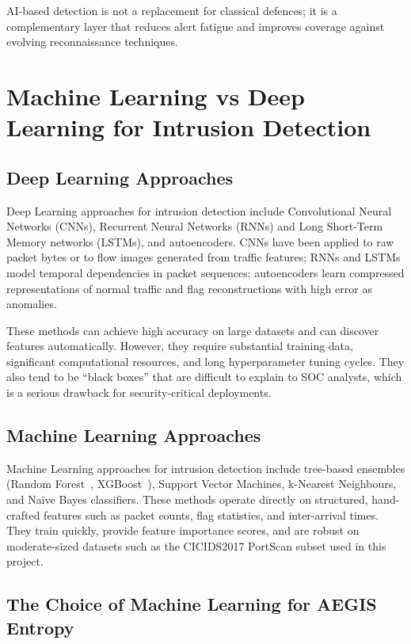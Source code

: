 \documentclass[12pt,a4paper]{report}
\begin{document}
AI-based detection is not a replacement for classical defences; it is a complementary layer that reduces alert fatigue and improves coverage against evolving reconnaissance techniques.

\section{Machine Learning vs Deep Learning for Intrusion Detection}\label{sec:ml_dl}

\subsection{Deep Learning Approaches}

Deep Learning approaches for intrusion detection include Convolutional Neural Networks (CNNs), Recurrent Neural Networks (RNNs) and Long Short-Term Memory networks (LSTMs), and autoencoders. CNNs have been applied to raw packet bytes or to flow images generated from traffic features; RNNs and LSTMs model temporal dependencies in packet sequences; autoencoders learn compressed representations of normal traffic and flag reconstructions with high error as anomalies.

These methods can achieve high accuracy on large datasets and can discover features automatically. However, they require substantial training data, significant computational resources, and long hyperparameter tuning cycles. They also tend to be ``black boxes'' that are difficult to explain to SOC analysts, which is a serious drawback for security-critical deployments.

\subsection{Machine Learning Approaches}

Machine Learning approaches for intrusion detection include tree-based ensembles (Random Forest~\cite{breiman2001}, XGBoost~\cite{chen2016}), Support Vector Machines, k-Nearest Neighbours, and Na\"{i}ve Bayes classifiers. These methods operate directly on structured, hand-crafted features such as packet counts, flag statistics, and inter-arrival times. They train quickly, provide feature importance scores, and are robust on moderate-sized datasets such as the CICIDS2017 PortScan subset used in this project.

\subsection{The Choice of Machine Learning for AEGIS Entropy}
\end{document}

